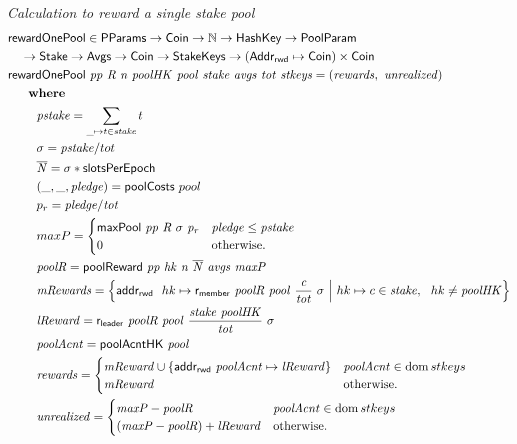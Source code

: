 \begin{figure}[htb]
  \emph{Calculation to reward a single stake pool}
  \begin{align*}
      & \mathsf{rewardOnePool} \in \mathsf{PParams} \to \mathsf{Coin} \to \mathbb{N} \to \mathsf{HashKey} \to \mathsf{PoolParam}\\
      & ~~~\to \mathsf{Stake} \to \mathsf{Avgs} \to \mathsf{Coin} \to \mathsf{StakeKeys} \to (\mathsf{Addr_{rwd}} \mapsto \mathsf{Coin})\times\mathsf{Coin} \\
      & \mathsf{rewardOnePool}~\mathit{pp}~\mathit{R}~\mathit{n}~\mathit{poolHK}~\mathit{pool}~\mathit{stake}~\mathit{avgs}~\mathit{tot}~\mathit{stkeys} =
          (\mathit{rewards},~\mathit{unrealized})\\
      & ~~~~ ~ \mathbf{where}~ ~  \\
      & ~~~~~~~\mathit{pstake} = \sum_{\_\mapsto t\in\mathit{stake}} t \\
      & ~~~~~~~\sigma = \mathit{pstake} / tot \\
      & ~~~~~~~\mathit{\overline{N}} = \sigma * \mathsf{slotsPerEpoch}\\
      & ~~~~~~~(\_, \_, \mathit{pledge}) = \mathsf{poolCosts}~pool \\
      & ~~~~~~~p_{r} = \mathit{pledge} / \mathit{tot} \\
      & ~~~~~~~maxP =
      \begin{cases}
        \mathsf{maxPool}~\mathit{pp}~\mathit{R}~\sigma~\mathit{p_r}&
        \mathit{pledge} \leq \mathit{pstake}\\
        0 & \text{otherwise.}
      \end{cases} \\
      & ~~~~~~~\mathit{poolR} = \mathsf{poolReward}~\mathit{pp}~\mathit{hk}~\mathit{n}~\mathit{\overline{N}}~\mathit{avgs}~\mathit{maxP} \\
      & ~~~~~~~\mathit{mRewards} = \left\{
                                  \mathsf{addr_{rwd}}~ \mathit{~}hk\mapsto\mathsf{r_{member}}~ \mathit{poolR}~ \mathit{pool}~ \mathit{\frac{c}{tot}}~ {\sigma}
                                  ~\Big\vert~
                                  hk\mapsto c\in\mathit{stake},~~hk \neq\mathit{poolHK}
                               \right\}\\
      & ~~~~~~~\mathit{lReward} = \mathsf{r_{leader}}~ \mathit{poolR}~ \mathit{pool}~ \mathit{\frac{\mathit{stake}~\mathit{poolHK}}{tot}}~ {\sigma} \\
      & ~~~~~~~\mathit{poolAcnt} = \mathsf{poolAcntHK}~\mathit{pool} \\
      & ~~~~~~~\mathit{rewards} =
                 \begin{cases}
                   \mathit{mReward}\cup\{\mathsf{addr_{rwd}}~ \mathit{\mathit{poolAcnt}}\mapsto\mathit{lReward}\}
                   & \mathit{poolAcnt} \in \operatorname{dom}{stkeys} \\
                   \mathit{mReward} & \text{otherwise.} \\
                 \end{cases} \\
      & ~~~~~~~\mathit{unrealized} =
                 \begin{cases}
                   \mathit{maxP} - \mathit{poolR} & \mathit{poolAcnt} \in \operatorname{dom}{stkeys} \\
                   (\mathit{maxP} - \mathit{poolR})+\mathit{lReward} & \text{otherwise.} \\
                 \end{cases} \\
  \end{align*}


\end{figure}
